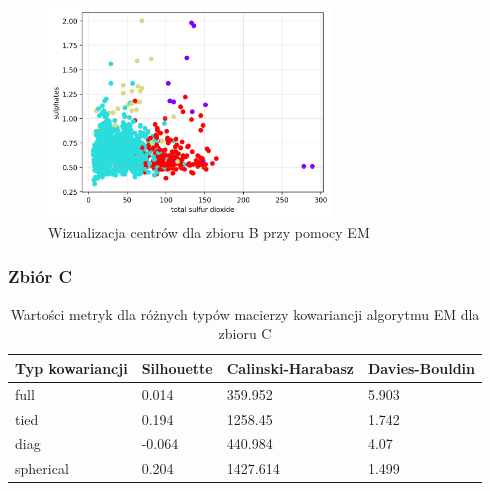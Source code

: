 \documentclass[a4paper,11pt]{article}
\begin{document}
\begin{figure}[H]
    \centering
    \includegraphics[width=0.67\textwidth]{images2/EM/wines/ExpectationMaximization_Wines_xtotalsulfurdioxide_ysulphates.png}
    \caption{Wizualizacja centrów dla zbioru B przy pomocy EM}
    \label{fig:em_b_2}
\end{figure}

\subsubsection*{Zbiór C}

\begin{table}[H]
    \centering
    \begin{tabular}{|l|l|l|l|}
    \hline
    \textbf{Typ kowariancji} & \textbf{Silhouette} & \textbf{Calinski-Harabasz} & \textbf{Davies-Bouldin} \\ \hline
    full                     & 0.014               & 359.952                    & 5.903                   \\ \hline
    tied                     & 0.194               & 1258.45                    & 1.742                   \\ \hline
    diag                     & -0.064              & 440.984                    & 4.07                    \\ \hline
    spherical                & 0.204               & 1427.614                   & 1.499                   \\ \hline
    \end{tabular}
    \caption{Wartości metryk dla różnych typów macierzy kowariancji algorytmu EM dla zbioru C}
    \label{tab:em_c_cov}
\end{table}
\end{document}
